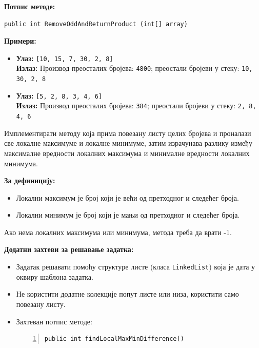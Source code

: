 \textbf{Потпис методе:}
\begin{Verbatim}[fontsize=\small]
public int RemoveOddAndReturnProduct (int[] array)
\end{Verbatim}

\textbf{Примери:}
\begin{itemize}
    \item \textbf{Улаз:} \texttt{[10, 15, 7, 30, 2, 8]} \\
          \textbf{Излаз:} Производ преосталих бројева: \texttt{4800}; преостали бројеви у стеку: \texttt{10, 30, 2, 8}
    \item \textbf{Улаз:} \texttt{[5, 2, 8, 3, 4, 6]} \\
          \textbf{Излаз:} Производ преосталих бројева: \texttt{384}; преостали бројеви у стеку: \texttt{2, 8, 4, 6}
\end{itemize}



Имплементирати методу која прима повезану листу целих бројева и проналази све локалне максимуме и локалне минимуме, затим израчунава разлику између максималне вредности локалних максимума и минималне вредности локалних минимума.

\textbf{За дефиницију:}
\begin{itemize}
    \item Локални максимум је број који је већи од претходног и следећег броја.
    \item Локални минимум је број који је мањи од претходног и следећег броја.
\end{itemize}

Ако нема локалних максимума или минимума, метода треба да врати -1.

\textbf{Додатни захтеви за решавање задатка:}
\begin{itemize}
    \item Задатак решавати помоћу структуре листе (класа \texttt{LinkedList}) која је дата у оквиру шаблона задатка.
    \item Не користити додатне колекције попут листе или низа, користити само повезану листу.
    \item Захтеван потпис методе:
    \begin{Verbatim}[fontsize=\footnotesize, numbers=left, xleftmargin=10mm]
public int findLocalMaxMinDifference()
    \end{Verbatim}
\end{itemize}

